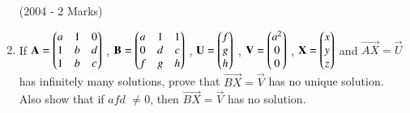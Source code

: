 \documentclass[journal,12pt,onecolumn]{IEEEtran}
\theoremstyle{remark}
\begin{document}
\begin{multicols}{2}
\begin{enumerate}
		\hfill(2004 - 2 Marks)

	\item If $\mathbf{A} = \begin{pmatrix}
			a & 1 & 0 \\
			1 & b & d \\
			1 & b & c \end{pmatrix}$ ,
		$\mathbf{B} = \begin{pmatrix}
			a & 1 & 1 \\
			0 & d & c \\
			f & g & h \end{pmatrix}$ ,
		$\mathbf{U} = \begin{pmatrix}
			f \\
			g \\
			h \end{pmatrix}$ ,
		$\mathbf{V} = \begin{pmatrix}
			a^2 \\
			0 \\
			0 \end{pmatrix}$ ,
		$\mathbf{X} = \begin{pmatrix}
			x \\
			y \\
			z \end{pmatrix}$
		and $\vec{AX}=\vec{U}$ has infinitely many solutions, prove that $\vec{BX}=\vec{V}$ has no unique solution. Also show that if $afd$ $\neq0$, then $\vec{BX}=\vec{V}$ has no solution.

\end{enumerate}
\end{multicols}

\end{document}
